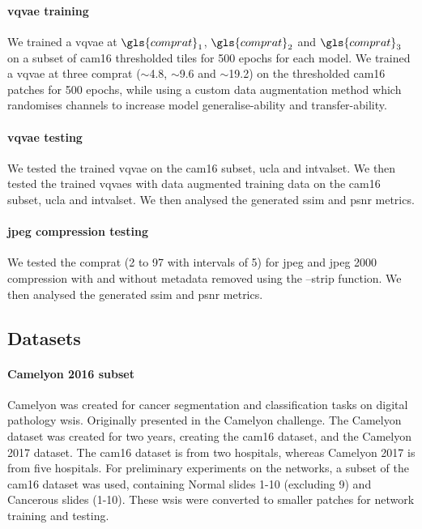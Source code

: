 \documentclass[review]{elsarticle}
\begin{document}
\paragraph{\gls{vqvae} training}
We trained a \gls{vqvae} at $\gls{comprat}_{1}$, $\gls{comprat}_{2}$ and $\gls{comprat}_{3}$ on a subset of \gls{cam16} thresholded tiles for 500 epochs for each model. We trained a \gls{vqvae} at three \gls{comprat} ($\sim$4.8, $\sim$9.6 and $\sim$19.2) on the thresholded \gls{cam16} patches for 500 epochs, while using a custom data augmentation method which randomises channels to increase model generalise-ability and transfer-ability.

\paragraph{\gls{vqvae} testing}
We tested the trained \gls{vqvae} on the \gls{cam16} subset, \gls{ucla} and \gls{intvalset}. We then tested the trained \glspl{vqvae} with data augmented training data on the \gls{cam16} subset, \gls{ucla} and \gls{intvalset}. We then analysed the generated \gls{ssim} and \gls{psnr} metrics.

\paragraph{\gls{jpeg} compression testing}
We tested the \gls{comprat} (2 to 97 with intervals of 5) for \gls{jpeg} and \gls{jpeg} 2000 compression with and without metadata removed using the --strip function. We then analysed the generated \gls{ssim} and \gls{psnr} metrics.

\subsection{Datasets}
\paragraph{Camelyon 2016 subset} Camelyon was created for cancer segmentation and classification tasks on digital pathology \glspl{wsi}. Originally presented in the Camelyon challenge. The Camelyon dataset was created for two years, creating the \gls{cam16} dataset, and the Camelyon 2017 dataset. The \gls{cam16} dataset is from two hospitals, whereas Camelyon 2017 is from five hospitals. For preliminary experiments on the networks, a subset of the \gls{cam16} dataset was used, containing Normal slides 1-10 (excluding 9) and Cancerous slides (1-10). These \glspl{wsi} were converted to smaller patches for network training and testing.
\end{document}
